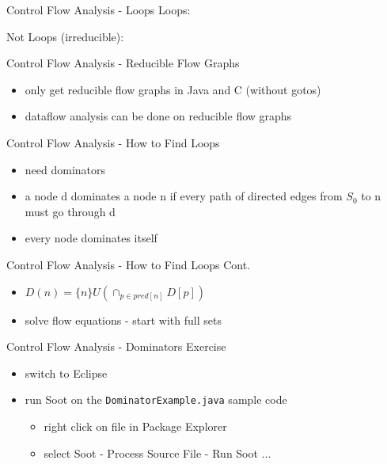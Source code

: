 \documentclass[mcgill,slideColor,colorBG,pdf]{prosper}
\begin{document}
\begin{slide} {Control Flow Analysis - Loops}
Loops:
\begin{center}
\end{center}
Not Loops (irreducible): 
\begin{center}
\end{center}
\end{slide}

\begin{slide} {Control Flow Analysis - Reducible Flow Graphs}
\begin{itemize}
\item only get reducible flow graphs in Java and C (without gotos)
\item dataflow analysis can be done on reducible flow graphs
\end{itemize}
\end{slide}

\begin{slide} {Control Flow Analysis - How to Find Loops}
\begin{itemize}
\item need dominators
\begin{center}
\end{center}
\item a node d dominates a node n if every path of directed edges from $S_0$ to n must go through d
\item every node dominates itself
\end{itemize}
\end{slide}

\begin{slide} {Control Flow Analysis - How to Find Loops Cont.}
\begin{center}
\end{center}
\begin{itemize}
\item $D(n) = \{n\} U (\cap_{p \in pred[n]} D[p])$
\item solve flow equations - start with full sets
\end{itemize}
\end{slide}

\begin{slide} {Control Flow Analysis - Dominators Exercise}
\begin{itemize}
\item switch to Eclipse
\item run Soot on the \texttt{DominatorExample.java} sample code
\begin{itemize}
\item right click on file in Package Explorer
\item select Soot - Process Source File - Run Soot ...
\end{itemize}
\end{itemize}
\end{slide}
\end{document}
